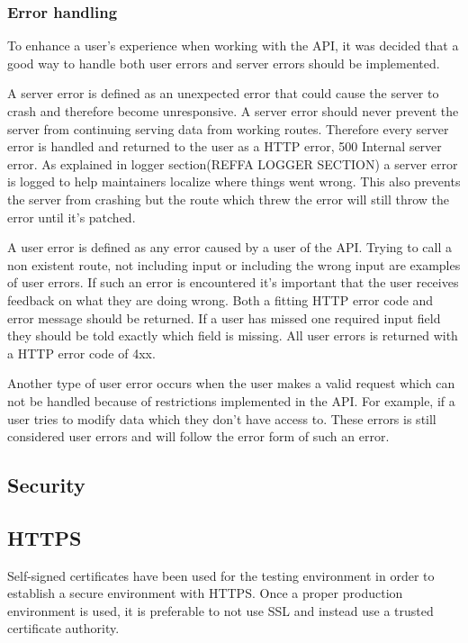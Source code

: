 \subsubsection{Error handling}
To enhance a user's experience when working with the API, it was decided that a good way to handle both user errors and server errors should be implemented.

A server error is defined as an unexpected error that could cause the server to crash and therefore become unresponsive. A server error should never prevent the server from continuing serving data from working routes. Therefore every server error is handled and returned to the user as a HTTP error, 500 Internal server error. As explained in logger section(REFFA LOGGER SECTION) a server error is logged to help maintainers localize where things went wrong. This also prevents the server from crashing but the route which threw the error will still throw the error until it's patched. 

A user error is defined as any error caused by a user of the API. Trying to call a non existent route, not including input or including the wrong input are examples of user errors. If such an error is encountered it's important that the user receives feedback on what they are doing wrong. Both a fitting HTTP error code and error message should be returned. If a user has missed one required input field they should be told exactly which field is missing. All user errors is returned with a HTTP error code of 4xx.

Another type of user error occurs when the user makes a valid request which can not be handled because of restrictions implemented in the API. For example, if a user tries to modify data which they don't have access to. These errors is still considered user errors and will follow the error form of such an error.

\subsection{Security}

\subsection{HTTPS} \label{https}
Self-signed certificates have been used for the testing environment in order to establish a secure environment with HTTPS. Once a proper production environment is used, it is preferable to not use SSL and instead use a trusted certificate authority.

